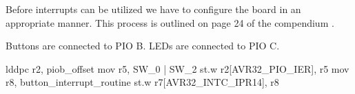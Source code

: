 Before interrupts can be utilized we have to configure the board in an appropriate manner.
This process is outlined on page 24 of the compendium \cite{lab-compendium}.


Buttons are connected to PIO B.
LEDs are connected to PIO C.


lddpc r2, piob_offset
mov r5, SW_0 | SW_2
st.w r2[AVR32_PIO_IER], r5
mov r8, button_interrupt_routine
st.w r7[AVR32_INTC_IPR14], r8
